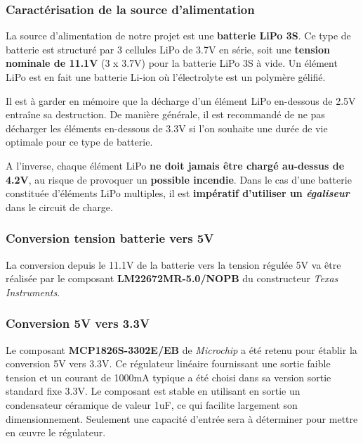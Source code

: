 \documentclass[a4paper,12pt]{report}
\begin{document}
			\subsubsection{Caractérisation de la source d'alimentation}
			
			La source d'alimentation de notre projet est une \textbf{batterie LiPo 3S}. Ce type de batterie est structuré par 3 cellules LiPo de 3.7V en série, soit une \textbf{tension nominale de 11.1V} (3 x 3.7V) pour la batterie LiPo 3S à vide. Un élément LiPo est en fait une batterie Li-ion où l'électrolyte est un polymère gélifié.
			
			Il est à garder en mémoire que la décharge d'un élément LiPo en-dessous de 2.5V entraîne sa destruction. De manière générale, il est recommandé de ne pas décharger les éléments en-dessous de 3.3V si l'on souhaite une durée de vie optimale pour ce type de batterie. 
			
		A l'inverse, chaque élément LiPo \textbf{ne doit jamais être chargé au-dessus de 4.2V}, au risque de provoquer un \textbf{possible incendie}. Dans le cas d'une batterie constituée d'éléments LiPo multiples, il est \textbf{impératif d'utiliser un \textit{égaliseur}} dans le circuit de charge.
		
			
			\subsubsection{Conversion tension batterie vers 5V}
				
			La conversion depuis le 11.1V de la batterie vers la tension régulée 5V va être réalisée par le composant \textbf{LM22672MR-5.0/NOPB} du constructeur \textit{Texas Instruments}.
			
			\subsubsection{Conversion 5V vers 3.3V}
			
			Le composant \textbf{MCP1826S-3302E/EB} de \textit{Microchip} a été retenu pour établir la conversion 5V vers 3.3V. Ce régulateur linéaire fournissant une sortie faible tension et un courant de 1000mA typique a été choisi dans sa version sortie standard fixe 3.3V. Le composant est stable en utilisant en sortie un condensateur céramique de valeur 1uF, ce qui facilite largement son dimensionnement. Seulement une capacité d'entrée sera à déterminer pour mettre en œuvre le régulateur.
	
\end{document}
